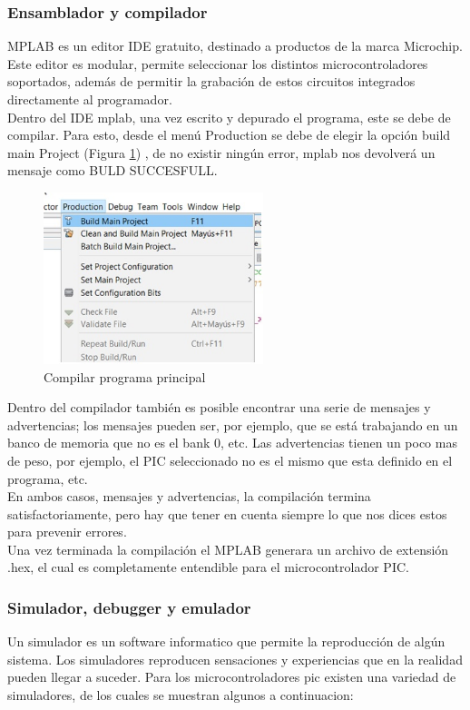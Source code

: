 \documentclass[12pt,a4paper]{article}
\begin{document}
   \subsubsection{Ensamblador y compilador}
   MPLAB es un editor IDE gratuito, destinado a productos de la marca Microchip. Este editor es modular, permite seleccionar los distintos microcontroladores soportados, además de permitir la grabación de estos circuitos integrados directamente al programador. \\
   Dentro del IDE mplab, una vez escrito y depurado el programa, este se debe de compilar. Para esto, desde el menú Production se debe de elegir la opción build main Project (Figura \ref{fig:screnMP}) , de no existir ningún error, mplab nos devolverá un mensaje como BULD SUCCESFULL.\\
   
   \begin{figure}[htpb]
   \centering
   \includegraphics[height=5cm]{screenMPLAB}
   \caption{Compilar programa principal}
   \label{fig:screnMP}
   \end{figure}
   
   Dentro del compilador también es posible encontrar una serie de mensajes y advertencias; los mensajes pueden ser, por ejemplo, que se está trabajando en un banco de memoria que no es el bank 0, etc. Las advertencias tienen un poco mas de peso, por ejemplo, el PIC seleccionado no es el mismo que esta definido en el programa, etc.\\
   En ambos casos, mensajes y advertencias, la compilación termina satisfactoriamente, pero hay que tener en cuenta siempre lo que nos dices estos para prevenir errores.\\
   Una vez terminada la compilación el MPLAB generara un archivo de extensión .hex, el cual es completamente entendible para el microcontrolador PIC.
   
   \subsubsection{Simulador, debugger y emulador}
   Un simulador es un software informatico que permite la reproducción de algún sistema. Los simuladores reproducen sensaciones y experiencias que en la realidad pueden llegar a suceder. Para los microcontroladores pic existen una variedad de simuladores, de los cuales se muestran algunos a continuacion:\\
   
\end{document}

